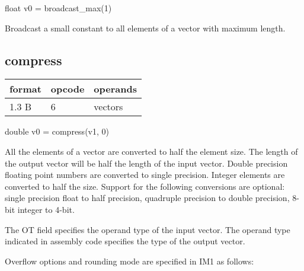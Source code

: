 \documentclass[forwardcom.tex]{subfiles}
\begin{document}
float v0 = broadcast\_max(1)
\vv

Broadcast a small constant to all elements of a vector with maximum length.
\vv


\subsection{compress}
\label{table:compressInstruction}
\begin{tabular}{|p{12mm}|p{15mm}|p{100mm}|}
\hline
\bfseries format & \bfseries opcode & \bfseries operands \\ \hline
1.3 B & 6 & vectors \\ \hline
\end{tabular}
\vv

double v0 = compress(v1, 0)
\vv

All the elements of a vector are converted to half the element size. The length of the output vector will be half the length of the input vector.
Double precision floating point numbers are converted to single precision. Integer elements are converted to half the size. Support for the following conversions are optional: single precision float to half precision, quadruple precision to double precision, 8-bit integer to 4-bit.
\vv

The OT field specifies the operand type of the input vector. The operand type indicated in assembly code specifies the type of the output vector.
\vv

Overflow options and rounding mode are specified in IM1 as follows:
\end{document}
